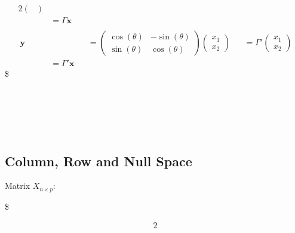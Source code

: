 \documentclass[
]{book}
\begin{document}
{{{\begin{alignat}{2}
\begin{pmatrix}
\end{pmatrix}

\\
 
&= \Gamma \pmb x \tag{clockwise rotation}



\\\
\\\



\pmb y &


&&=


\begin{pmatrix} 

\cos(\theta) & -\sin(\theta) \\

\sin(\theta) & \cos(\theta) 


\end{pmatrix}




\begin{pmatrix} 

x_1 \\ x_2 

\end{pmatrix}

&&= \Gamma  ' 

\begin{pmatrix} 

x_1 \\ x_2 

\end{pmatrix}

\\

& = \Gamma  '  \pmb x \tag{counter-clockwise rotation}




\end{alignat}
\$

~\\
~\\
~\\
~\\

\hypertarget{column-row-and-null-space}{%
\subsection{Column, Row and Null Space}\label{column-row-and-null-space}}

Matrix \(X_{n \times p}\):

\$

\begin{alignat}{2}


\end{alignat}}}}
\end{document}
